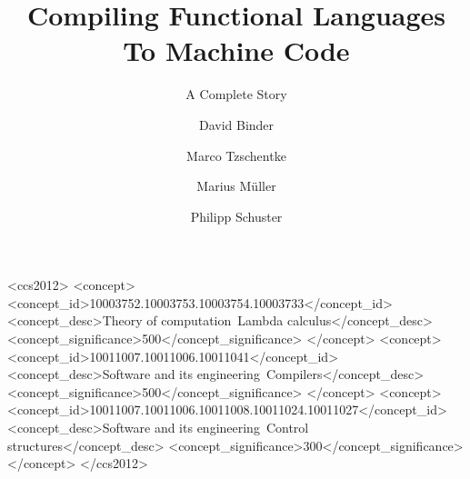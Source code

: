 \documentclass[nonacm]{acmart}
\begin{document}
\title{Compiling Functional Languages To Machine Code}
\subtitle{A Complete Story}



\begin{CCSXML}
  <ccs2012>
     <concept>
         <concept_id>10003752.10003753.10003754.10003733</concept_id>
         <concept_desc>Theory of computation~Lambda calculus</concept_desc>
         <concept_significance>500</concept_significance>
         </concept>
     <concept>
         <concept_id>10011007.10011006.10011041</concept_id>
         <concept_desc>Software and its engineering~Compilers</concept_desc>
         <concept_significance>500</concept_significance>
         </concept>
     <concept>
         <concept_id>10011007.10011006.10011008.10011024.10011027</concept_id>
         <concept_desc>Software and its engineering~Control structures</concept_desc>
         <concept_significance>300</concept_significance>
         </concept>
   </ccs2012>
\end{CCSXML}
  

\author{David Binder}

\author{Marco Tzschentke}

\author{Marius Müller}

\author{Philipp Schuster}
\end{document}
